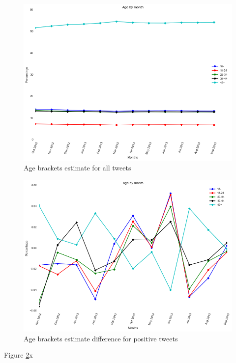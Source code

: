 \documentclass{sig-alternate}
\begin{document}
\begin{figure}[t]
\includegraphics[width=\columnwidth]{all_45+.png}
\centering
\caption{ Age brackets estimate for all tweets}
\label{figura:all_45+}
\end{figure}


\begin{figure}[t]
\includegraphics[width=\columnwidth]{pos_45+diff.png}
\centering
\caption{Age brackets estimate difference for positive tweets}
\label{figura:pos_45+diff}
\end{figure}

Figure \ref{figura:pos_45+diff}x
\end{document}
